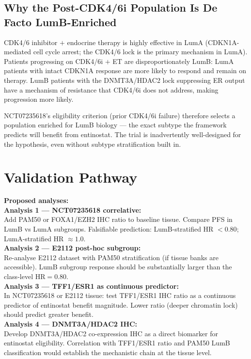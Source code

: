 \documentclass[12pt, a4paper]{article}
\begin{document}
\subsection{Why the Post-CDK4/6i Population
Is De Facto LumB-Enriched}

CDK4/6 inhibitor $+$ endocrine therapy is
highly effective in LumA (CDKN1A-mediated cell
cycle arrest; the CDK4/6 lock is the primary
mechanism in LumA). Patients progressing on
CDK4/6i $+$ ET are disproportionately LumB:
LumA patients with intact CDKN1A response are
more likely to respond and remain on therapy.
LumB patients with the DNMT3A/HDAC2 lock
suppressing ER output have a mechanism of
resistance that CDK4/6i does not address, making
progression more likely.

NCT07235618's eligibility criterion (prior CDK4/6i
failure) therefore selects a population enriched
for LumB biology --- the exact subtype the
framework predicts will benefit from entinostat.
The trial is inadvertently well-designed for
the hypothesis, even without subtype stratification
built in.

\section{Validation Pathway}

\begin{center}
\colorbox{actionbox}{
\begin{minipage}{0.88\textwidth}
\vspace{0.5em}
\textbf{Proposed analyses:}\\[0.4em]
\textbf{Analysis 1 --- NCT07235618 correlative:}\\
Add PAM50 or FOXA1/EZH2 IHC ratio to baseline
tissue. Compare PFS in LumB vs LumA subgroups.
Falsifiable prediction: LumB-stratified HR
$<0.80$; LumA-stratified HR $\approx 1.0$.\\[0.4em]
\textbf{Analysis 2 --- E2112 post-hoc subgroup:}\\
Re-analyse E2112 dataset with PAM50 stratification
(if tissue banks are accessible). LumB subgroup
response should be substantially larger than the
class-level HR$=0.80$.\\[0.4em]
\textbf{Analysis 3 --- TFF1/ESR1 as continuous
predictor:}\\
In NCT07235618 or E2112 tissue: test TFF1/ESR1
IHC ratio as a continuous predictor of entinostat
benefit magnitude. Lower ratio (deeper chromatin
lock) should predict greater benefit.\\[0.4em]
\textbf{Analysis 4 --- DNMT3A/HDAC2 IHC:}\\
Develop DNMT3A/HDAC2 co-expression IHC as a
direct biomarker for entinostat eligibility.
Correlation with TFF1/ESR1 ratio and PAM50 LumB
classification would establish the mechanistic
chain at the tissue level.
\vspace{0.5em}
\end{minipage}}
\end{center}
\end{document}
